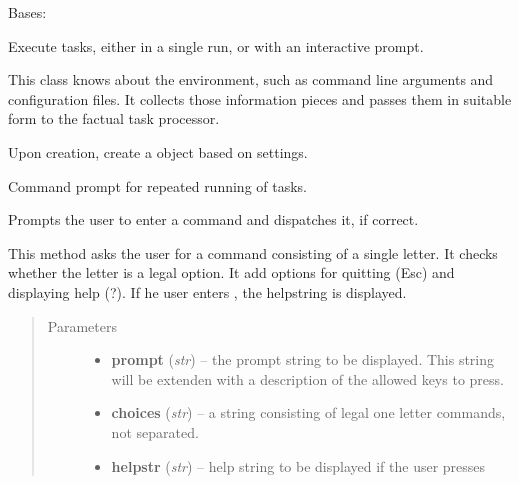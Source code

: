 \documentclass[letterpaper,10pt,english]{sphinxmanual}
\begin{document}
\begin{fulllineitems}
\label{graf/graf:graf.Shell}
Bases: 

Execute tasks, either in a single run, or with an interactive prompt.

This class knows about the environment, such as command line arguments
and configuration files.
It collects those information pieces and passes them in suitable form
to the factual task processor.

Upon creation, create a {\hyperref[graf/graf:graf.task.GrafTask]{}} object based on settings.

\begin{fulllineitems}
\label{graf/graf:graf.Shell.command_loop}
Command prompt for repeated running of tasks.

\end{fulllineitems}


\begin{fulllineitems}
\label{graf/graf:graf.Shell.do_command}
Prompts the user to enter a command and dispatches it, if correct.

This method asks the user for a command consisting of a single letter.
It checks whether the letter is a legal option.
It add options for quitting (Esc) and displaying help (?).
If he user enters , the helpstring is displayed.
\begin{quote}\begin{description}
\item[{Parameters}] \leavevmode\begin{itemize}
\item {} 
\textbf{prompt} (\emph{str}) --
the prompt string to be displayed.
This string will be extenden with a description of the allowed keys to press.

\item {} 
\textbf{choices} (\emph{str}) --
a string consisting of legal  one letter commands, not separated.

\item {} 
\textbf{helpstr} (\emph{str}) --
help string to be displayed if the user presses 

\end{itemize}


\end{description}
\end{quote}
\end{fulllineitems}
\end{fulllineitems}
\end{document}
